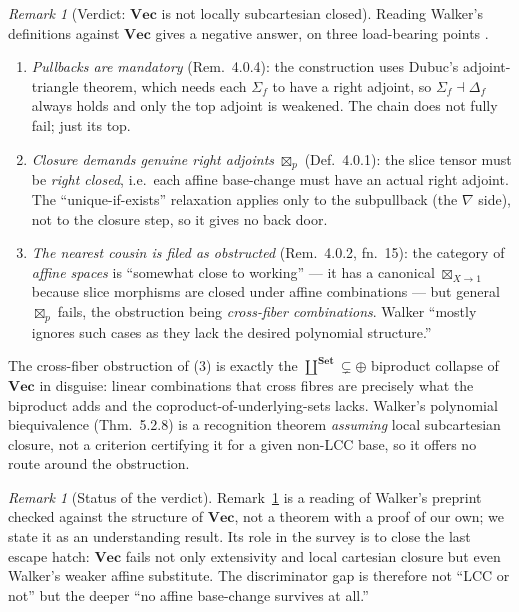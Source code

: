 \documentclass[11pt]{amsart}
\theoremstyle{plain}
\theoremstyle{definition}
\theoremstyle{remark}
\newtheorem{remark}[theorem]{Remark}
\newcommand{\Set}{\mathbf{Set}}
\newcommand{\Vect}{\mathbf{Vec}}
\begin{document}
\begin{remark}[Verdict: $\Vect$ is not locally subcartesian closed]\label{rem:walkerverdict}
Reading Walker's definitions against $\Vect$ gives a negative answer, on three load-bearing points
\cite[Def.~4.0.1, Rem.~4.0.2, Rem.~4.0.4, fn.~15]{Walker}.
\begin{enumerate}
\item \emph{Pullbacks are mandatory} (Rem.~4.0.4): the construction uses Dubuc's adjoint-triangle
theorem, which needs each $\Sigma_f$ to have a right adjoint, so $\Sigma_f\dashv\Delta_f$ always
holds and only the top adjoint is weakened. The chain does not fully fail; just its top.
\item \emph{Closure demands genuine right adjoints} $\boxtimes_p$ (Def.~4.0.1): the slice tensor must
be \emph{right closed}, i.e.\ each affine base-change must have an actual right adjoint. The
``unique-if-exists'' relaxation applies only to the subpullback (the $\nabla$ side), not to the
closure step, so it gives no back door.
\item \emph{The nearest cousin is filed as obstructed} (Rem.~4.0.2, fn.~15): the category of
\emph{affine spaces} is ``somewhat close to working'' --- it has a canonical $\boxtimes_{X\to 1}$
because slice morphisms are closed under affine combinations --- but general $\boxtimes_p$ fails, the
obstruction being \emph{cross-fiber combinations}. Walker ``mostly ignores such cases as they lack
the desired polynomial structure.''
\end{enumerate}
The cross-fiber obstruction of (3) is exactly the $\coprod^{\Set}\subsetneq\oplus$ biproduct collapse
of $\Vect$ in disguise: linear combinations that cross fibres are precisely what the biproduct adds
and the coproduct-of-underlying-sets lacks. Walker's polynomial biequivalence (Thm.~5.2.8) is a
recognition theorem \emph{assuming} local subcartesian closure, not a criterion certifying it for a
given non-LCC base, so it offers no route around the obstruction.
\end{remark}

\begin{remark}[Status of the verdict]\label{rem:walkerstatus}
Remark~\ref{rem:walkerverdict} is a reading of Walker's preprint checked against the structure of
$\Vect$, not a theorem with a proof of our own; we state it as an understanding result. Its role in
the survey is to close the last escape hatch: $\Vect$ fails not only extensivity and local cartesian
closure but even Walker's weaker affine substitute. The discriminator gap is therefore not ``LCC or
not'' but the deeper ``no affine base-change survives at all.''
\end{remark}
\end{document}
